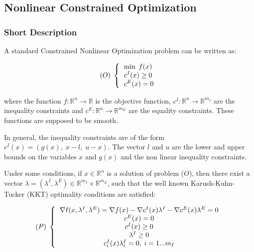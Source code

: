 \subsection{Nonlinear Constrained Optimization}
\subsubsection{Short Description}

A standard Constrained Nonlinear Optimization problem can be written as:

\begin{equation*}
(O)\;
\left\{
\begin{tabular}{l}
    $\displaystyle   \min \; f(x)$ \\
    $\displaystyle c^I(x) \geq 0$ \\
    $\displaystyle c^E(x) = 0$
\end{tabular}
\right.
\end{equation*}

where the function $f : \mathbb{R}^n \rightarrow  \mathbb{R}$ is the objective function, $c^I : \mathbb{R}^n \rightarrow  \mathbb{R}^{m_I} $ are the inequality constraints and $c^E : \mathbb{R}^n \rightarrow  \mathbb{R}^{m_E} $ are the equality constraints. These functions are supposed to be smooth.

In general, the inequality constraints are of the form $c^I(x) = \left (g(x), \; x-l, \; u-x \right )$. The vector $l$ and $u$ are the lower and upper bounds on the variables $x$ and $g(x)$ and the non linear inequality constraints.

Under some conditions, if $x \in \mathbb{R}^n$ is a solution of problem ($O$), then there exist a vector $\lambda=(\lambda^I,\lambda^E) \in \mathbb{R}^{m_I} \times \mathbb{R}^{m_E}$, such that the well known Karush-Kuhn-Tucker (KKT) optimality conditions are satisfied:

    \begin{equation*}
    (P)\;
    \left\{
    \begin{tabular}{c}
    $\nabla \ell(x,\lambda^I, \lambda^E) = \nabla f(x) - \nabla c^I(x) \lambda^I - \nabla c^E(x) \lambda^E= 0$ \\
    $c^E(x) = 0 $ \\
    $c^I(x) \geq 0 $ \\
    $\lambda^I \geq 0 $\\
    $c^I_i(x) \lambda^I_i =0, \; i=1...m_I$ \\
    \end{tabular}
    \right.
    \end{equation*}

